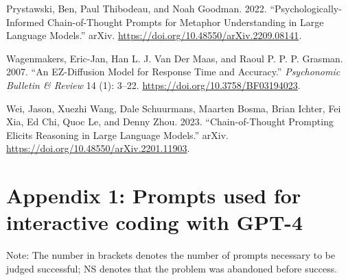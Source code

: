 \documentclass[
]{article}
\newlength{\cslhangindent}
\newlength{\cslentryspacingunit} %
\newenvironment{CSLReferences}[2] %
 {%
  \setlength{\parindent}{0pt}
  \ifodd #1
  \let\oldpar\par
  \def\par{\hangindent=\cslhangindent\oldpar}
  \fi
  \setlength{\parskip}{#2\cslentryspacingunit}
 }%
 {}
\begin{document}
\begin{CSLReferences}{1}{0}
\leavevmode{}%
Prystawski, Ben, Paul Thibodeau, and Noah Goodman. 2022.
{``Psychologically-Informed Chain-of-Thought Prompts for Metaphor
Understanding in Large Language Models.''} arXiv.
\url{https://doi.org/10.48550/arXiv.2209.08141}.

\leavevmode{}%
Wagenmakers, Eric-Jan, Han L. J. Van Der Maas, and Raoul P. P. P.
Grasman. 2007. {``An {EZ}-Diffusion Model for Response Time and
Accuracy.''} \emph{Psychonomic Bulletin \& Review} 14 (1): 3--22.
\url{https://doi.org/10.3758/BF03194023}.

\leavevmode{}%
Wei, Jason, Xuezhi Wang, Dale Schuurmans, Maarten Bosma, Brian Ichter,
Fei Xia, Ed Chi, Quoc Le, and Denny Zhou. 2023. {``Chain-of-{Thought}
{Prompting} {Elicits} {Reasoning} in {Large} {Language} {Models}.''}
arXiv. \url{https://doi.org/10.48550/arXiv.2201.11903}.

\end{CSLReferences}

\hypertarget{appendix-1-prompts-used-for-interactive-coding-with-gpt-4}{%
\section{Appendix 1: Prompts used for interactive coding with
GPT-4}\label{appendix-1-prompts-used-for-interactive-coding-with-gpt-4}}

Note: The number in brackets denotes the number of prompts necessary to
be judged successful; NS denotes that the problem was abandoned before
success.
\end{document}
